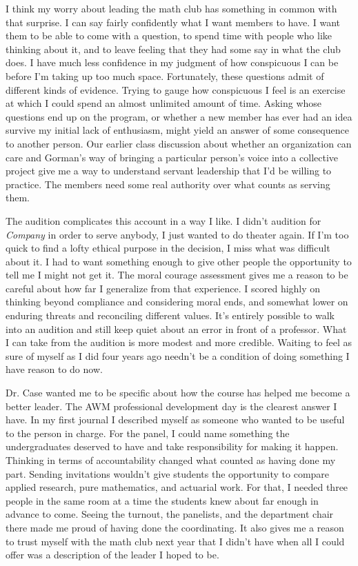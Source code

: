 \documentclass[12pt,letterpaper]{article}
\begin{document}
I think my worry about leading the math club has something in common with that surprise. I can say fairly confidently what I want members to have. I want them to be able to come with a question, to spend time with people who like thinking about it, and to leave feeling that they had some say in what the club does. I have much less confidence in my judgment of how conspicuous I can be before I'm taking up too much space. Fortunately, these questions admit of different kinds of evidence. Trying to gauge how conspicuous I feel is an exercise at which I could spend an almost unlimited amount of time. Asking whose questions end up on the program, or whether a new member has ever had an idea survive my initial lack of enthusiasm, might yield an answer of some consequence to another person. Our earlier class discussion about whether an organization can care and Gorman's way of bringing a particular person's voice into a collective project give me a way to understand servant leadership that I'd be willing to practice. The members need some real authority over what counts as serving them.

The audition complicates this account in a way I like. I didn't audition for \textit{Company} in order to serve anybody, I just wanted to do theater again. If I'm too quick to find a lofty ethical purpose in the decision, I miss what was difficult about it. I had to want something enough to give other people the opportunity to tell me I might not get it. The moral courage assessment gives me a reason to be careful about how far I generalize from that experience. I scored highly on thinking beyond compliance and considering moral ends, and somewhat lower on enduring threats and reconciling different values. It's entirely possible to walk into an audition and still keep quiet about an error in front of a professor. What I can take from the audition is more modest and more credible. Waiting to feel as sure of myself as I did four years ago needn't be a condition of doing something I have reason to do now.

Dr. Case wanted me to be specific about how the course has helped me become a better leader. The AWM professional development day is the clearest answer I have. In my first journal I described myself as someone who wanted to be useful to the person in charge. For the panel, I could name something the undergraduates deserved to have and take responsibility for making it happen. Thinking in terms of accountability changed what counted as having done my part. Sending invitations wouldn't give students the opportunity to compare applied research, pure mathematics, and actuarial work. For that, I needed three people in the same room at a time the students knew about far enough in advance to come. Seeing the turnout, the panelists, and the department chair there made me proud of having done the coordinating. It also gives me a reason to trust myself with the math club next year that I didn't have when all I could offer was a description of the leader I hoped to be.
\end{document}
